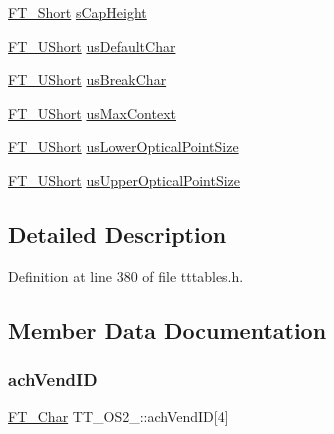 \begin{DoxyCompactItemize}
\item 
\mbox{\hyperlink{fttypes_8h_aa7279be89046a2563cd3d4d6651fbdcf}{F\+T\+\_\+\+Short}} \mbox{\hyperlink{struct_t_t___o_s2___ac755913b648d535d1207927e4a6f1ec0}{s\+Cap\+Height}}
\item 
\mbox{\hyperlink{fttypes_8h_a937f6c17cf5ffd09086d8610c37b9f58}{F\+T\+\_\+\+U\+Short}} \mbox{\hyperlink{struct_t_t___o_s2___af8639fefeb705a9287df996b224462ea}{us\+Default\+Char}}
\item 
\mbox{\hyperlink{fttypes_8h_a937f6c17cf5ffd09086d8610c37b9f58}{F\+T\+\_\+\+U\+Short}} \mbox{\hyperlink{struct_t_t___o_s2___a1d47030e246d2593ec3e4cdf66b17161}{us\+Break\+Char}}
\item 
\mbox{\hyperlink{fttypes_8h_a937f6c17cf5ffd09086d8610c37b9f58}{F\+T\+\_\+\+U\+Short}} \mbox{\hyperlink{struct_t_t___o_s2___a167313e407c77db2c4ca5a987f3a1482}{us\+Max\+Context}}
\item 
\mbox{\hyperlink{fttypes_8h_a937f6c17cf5ffd09086d8610c37b9f58}{F\+T\+\_\+\+U\+Short}} \mbox{\hyperlink{struct_t_t___o_s2___a76193c4f0a29357bab8d8d70af10121a}{us\+Lower\+Optical\+Point\+Size}}
\item 
\mbox{\hyperlink{fttypes_8h_a937f6c17cf5ffd09086d8610c37b9f58}{F\+T\+\_\+\+U\+Short}} \mbox{\hyperlink{struct_t_t___o_s2___a8b068c0e31e8c8de527f010b9860d2ae}{us\+Upper\+Optical\+Point\+Size}}
\end{DoxyCompactItemize}


\subsection{Detailed Description}


Definition at line 380 of file tttables.\+h.



\subsection{Member Data Documentation}
\mbox{\label{struct_t_t___o_s2___a01d027dea4daddaa278ba39c2c957d11}} 
\subsubsection{\texorpdfstring{achVendID}{achVendID}}
{\footnotesize\ttfamily \mbox{\hyperlink{fttypes_8h_a0f851552b050883885f0a0855771f39d}{F\+T\+\_\+\+Char}} T\+T\+\_\+\+O\+S2\+\_\+\+::ach\+Vend\+ID\mbox{[}4\mbox{]}}



